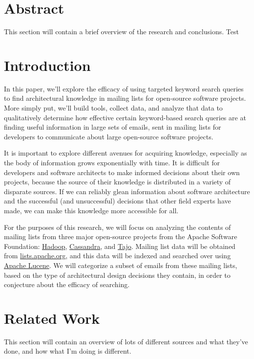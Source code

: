 \documentclass[a4paper, 12pt]{article}
\begin{document}


\section{Abstract}
	This section will contain a brief overview of the research and conclusions. Test



\section{Introduction}
	In this paper, we'll explore the efficacy of using targeted keyword search queries to find architectural knowledge in mailing lists for open-source software projects. More simply put, we'll build tools, collect data, and analyze that data to qualitatively determine how effective certain keyword-based search queries are at finding useful information in large sets of emails, sent in mailing lists for developers to communicate about large open-source software projects.
	
	It is important to explore different avenues for acquiring knowledge, especially as the body of information grows exponentially with time. It is difficult for developers and software architects to make informed decisions about their own projects, because the source of their knowledge is distributed in a variety of disparate sources. If we can reliably glean information about software architecture and the successful (and unsuccessful) decisions that other field experts have made, we can make this knowledge more accessible for all.
	
	For the purposes of this research, we will focus on analyzing the contents of mailing lists from three major open-source projects from the Apache Software Foundation: \href{https://hadoop.apache.org/}{Hadoop}, \href{https://cassandra.apache.org}{Cassandra}, and \href{https://attic.apache.org/projects/tajo.html}{Tajo}. Mailing list data will be obtained from \href{https://lists.apache.org/}{lists.apache.org}, and this data will be indexed and searched over using \href{https://lucene.apache.org/}{Apache Lucene}. We will categorize a subset of emails from these mailing lists, based on the type of architectural design decisions they contain, in order to conjecture about the efficacy of searching.
	
\section{Related Work}
	This section will contain an overview of lots of different sources and what they've done, and how what I'm doing is different.
\end{document}
